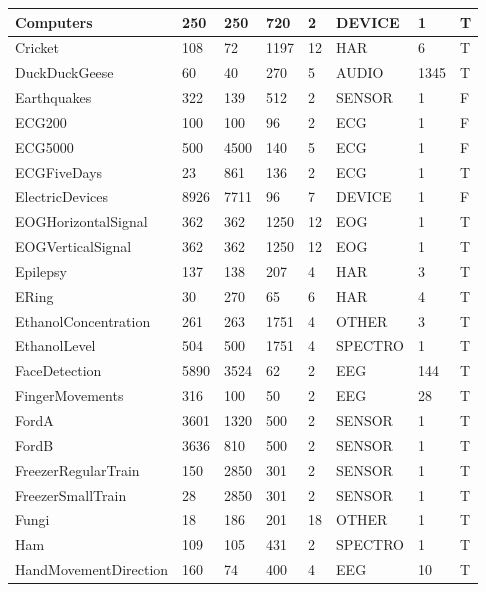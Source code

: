 \begin{landscape}
\begin{longtable}{|*{8}l|}
        \hline
        Computers & 250 & 250 & 720 & 2 & DEVICE & 1 & T \\
        \hline
        Cricket & 108 & 72 & 1197 & 12 & HAR & 6 & T \\
        \hline
        DuckDuckGeese & 60 & 40 & 270 & 5 & AUDIO & 1345 & T \\
        \hline
        Earthquakes & 322 & 139 & 512 & 2 & SENSOR & 1 & F \\
        \hline
        ECG200 & 100 & 100 & 96 & 2 & ECG & 1 & F \\
        \hline
        ECG5000 & 500 & 4500 & 140 & 5 & ECG & 1 & F \\
        \hline
        ECGFiveDays & 23 & 861 & 136 & 2 & ECG & 1 & T \\
        \hline
        ElectricDevices & 8926 & 7711 & 96 & 7 & DEVICE & 1 & F \\
        \hline
        EOGHorizontalSignal & 362 & 362 & 1250 & 12 & EOG & 1 & T \\
        \hline
        EOGVerticalSignal & 362 & 362 & 1250 & 12 & EOG & 1 & T \\
        \hline
        Epilepsy & 137 & 138 & 207 & 4 & HAR & 3 & T \\
        \hline
        ERing & 30 & 270 & 65 & 6 & HAR & 4 & T \\
        \hline
        EthanolConcentration & 261 & 263 & 1751 & 4 & OTHER & 3 & T \\
        \hline
        EthanolLevel & 504 & 500 & 1751 & 4 & SPECTRO & 1 & T \\
        \hline
        FaceDetection & 5890 & 3524 & 62 & 2 & EEG & 144 & T \\
        \hline
        FingerMovements & 316 & 100 & 50 & 2 & EEG & 28 & T \\
        \hline
        FordA & 3601 & 1320 & 500 & 2 & SENSOR & 1 & T \\
        \hline
        FordB & 3636 & 810 & 500 & 2 & SENSOR & 1 & T \\
        \hline
        FreezerRegularTrain & 150 & 2850 & 301 & 2 & SENSOR & 1 & T \\
        \hline
        FreezerSmallTrain & 28 & 2850 & 301 & 2 & SENSOR & 1 & T \\
        \hline
        Fungi & 18 & 186 & 201 & 18 & OTHER & 1 & T \\
        \hline
        Ham & 109 & 105 & 431 & 2 & SPECTRO & 1 & T \\
        \hline
        HandMovementDirection & 160 & 74 & 400 & 4 & EEG & 10 & T \\

\end{longtable}
\end{landscape}
